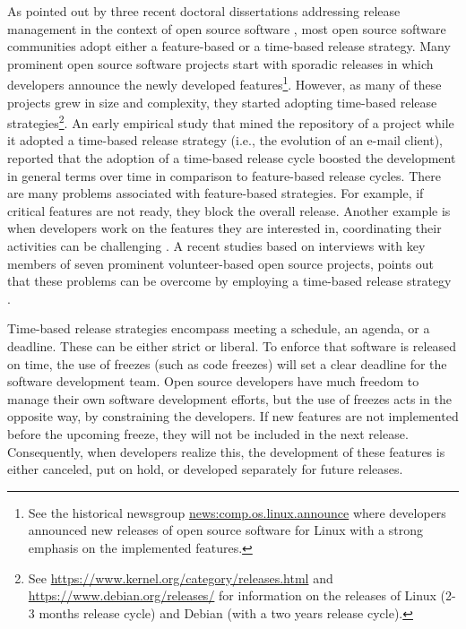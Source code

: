 \documentclass[dvipsnames]{bmcart}
\theoremstyle{definition}
\begin{document}
As pointed out by three recent doctoral dissertations addressing release management in the context of open source software  \cite{Michlmayr07qualityimprovement,wright2012release,poo2016release}, 
most open source software communities adopt either a feature-based or a time-based release strategy. Many prominent open source software projects start with sporadic releases in which developers announce the newly developed features\footnote{See the historical newsgroup \url{news:comp.os.linux.announce} where developers announced new releases of open source software for Linux with a strong emphasis on the implemented features.}. However, as many of these projects grew in size and complexity, they started adopting time-based release strategies\footnote{See  \url{https://www.kernel.org/category/releases.html}  and 
\url{https://www.debian.org/releases/} for information on the releases of Linux (2-3 months release cycle) and Debian (with a two years release cycle).}. 
An early empirical study \cite{martinez2008using} that mined the repository of a project while it adopted a time-based release strategy (i.e., the evolution of an e-mail client),  reported that the adoption of a time-based release cycle boosted the development in general terms over time in comparison to feature-based release cycles. 
%
There are many problems associated with feature-based strategies. For example, if critical features are not ready, they block the overall release.  Another example is when developers work on the features they are interested in, coordinating their activities can be challenging \cite{Michlmayr_et_al2007}.
A recent studies based on interviews with key members of seven prominent volunteer-based open source projects, points out that these problems can be overcome by employing a time-based release strategy \cite{michlmayr2012time,michlmayr2015and}. 

Time-based release strategies encompass meeting a schedule, an agenda, or a deadline. These can be either strict or liberal.  To enforce that software is released on time, the use of freezes (such as code freezes) will set a clear deadline for the software development team.  Open source developers have much freedom to manage their own software development efforts, but the use of freezes acts in the opposite way, by constraining the developers. If new features are not implemented before the upcoming freeze, they will not be included in the next release. Consequently, when developers realize this, the development of these features is either canceled, put on hold, or developed separately for future releases.
\end{document}

